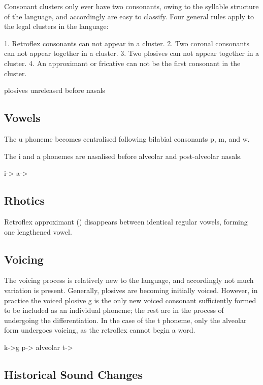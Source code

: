 Consonant clusters only ever have two consonants, owing to the syllable
structure of the language, and accordingly are easy to classify. Four general
rules apply to the legal clusters in the language:

1. Retroflex consonants can not appear in a cluster.
2. Two coronal consonants can not appear together in a cluster.
3. Two plosives can not appear together in a cluster.
4. An approximant or fricative can not be the first consonant in the cluster.

plosives unreleased before nasals



\subsection{Vowels}

The u phoneme becomes centralised following bilabial consonants p, m, and w.

The i and a phonemes are nasalised before alveolar and post-alveolar nasals.

i->
a->

\subsection{Rhotics}

\phonl{\textipa{\|]r}}{\textipa{\|]R}}{ShortV}

Retroflex approximant (\textipa{\textturnrrtail}) disappears between identical
regular vowels, forming one lengthened vowel.

\subsection{Voicing}

The voicing process is relatively new to the language, and accordingly not much
variation is present. Generally, plosives are becoming initially voiced.
However, in practice the voiced plosive g is the only new voiced consonant
sufficiently formed to be included as an individual phoneme; the rest are in the
process of undergoing the differentiation. In the case of the t phoneme, only
the alveolar form undergoes voicing, as the retroflex cannot begin a word.

k->g
p->
alveolar t->

\subsection{Historical Sound Changes}

